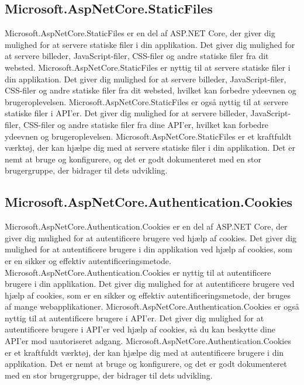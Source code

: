 \subsection{Microsoft.AspNetCore.StaticFiles}
Microsoft.AspNetCore.StaticFiles er en del af ASP.NET Core, der giver dig mulighed for at servere statiske filer i din applikation. Det giver dig mulighed for at servere billeder, JavaScript-filer, CSS-filer og andre statiske filer fra dit websted.
Microsoft.AspNetCore.StaticFiles er nyttig til at servere statiske filer i din applikation. Det giver dig mulighed for at servere billeder, JavaScript-filer, CSS-filer og andre statiske filer fra dit websted, hvilket kan forbedre ydeevnen og brugeroplevelsen.
Microsoft.AspNetCore.StaticFiles er også nyttig til at servere statiske filer i API'er. Det giver dig mulighed for at servere billeder, JavaScript-filer, CSS-filer og andre statiske filer fra dine API'er, hvilket kan forbedre ydeevnen og brugeroplevelsen.
Microsoft.AspNetCore.StaticFiles er et kraftfuldt værktøj, der kan hjælpe dig med at servere statiske filer i din applikation. Det er nemt at bruge og konfigurere, og det er godt dokumenteret med en stor brugergruppe, der bidrager til dets udvikling.

\subsection{Microsoft.AspNetCore.Authentication.Cookies}
Microsoft.AspNetCore.Authentication.Cookies er en del af ASP.NET Core, der giver dig mulighed for at autentificere brugere ved hjælp af cookies. Det giver dig mulighed for at autentificere brugere i din applikation ved hjælp af cookies, som er en sikker og effektiv autentificeringsmetode.
Microsoft.AspNetCore.Authentication.Cookies er nyttig til at autentificere brugere i din applikation. Det giver dig mulighed for at autentificere brugere ved hjælp af cookies, som er en sikker og effektiv autentificeringsmetode, der bruges af mange webapplikationer.
Microsoft.AspNetCore.Authentication.Cookies er også nyttig til at autentificere brugere i API'er. Det giver dig mulighed for at autentificere brugere i API'er ved hjælp af cookies, så du kan beskytte dine API'er mod uautoriseret adgang.
Microsoft.AspNetCore.Authentication.Cookies er et kraftfuldt værktøj, der kan hjælpe dig med at autentificere brugere i din applikation. Det er nemt at bruge og konfigurere, og det er godt dokumenteret med en stor brugergruppe, der bidrager til dets udvikling.

